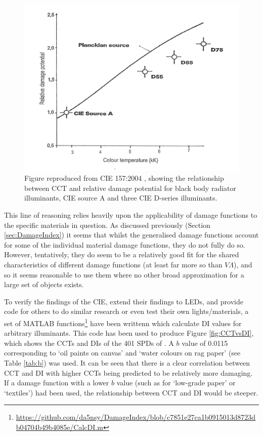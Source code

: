 \begin{figure}[hbtp]
\includegraphics[max width=\textwidth]{figs/LitRev/CIE2004.png} 
\caption{Figure reproduced from CIE 157:2004 \citep[p.16]{cie_cie_2004}, showing the relationship between \gls{CCT} and relative damage potential for black body radiator illuminants, \gls{CIE} source A and three \gls{CIE} D-series illuminants.}
\label{fig:CIE2004}
\end{figure}

This line of reasoning relies heavily upon the applicability of damage functions to the specific materials in question. As discussed previously (Section \ref{sec:DamageIndex}) it seems that whilst the generalised damage functions account for some of the individual material damage functions, they do not fully do so. However, tentatively, they do seem to be a relatively good fit for the shared characteristics of different damage functions (at least far more so than $V\Lambda$), and so it seems reasonable to use them where no other broad approximation for a large set of objects exists.

To verify the findings of the \gls{CIE}, extend their findings to \glspl{LED}, and provide code for others to do similar research or even test their own lights/materials, a set of MATLAB functions\footnote{\url{https://github.com/da5nsy/DamageIndex/blob/c7851e27ca1b0915013d8723db04704b49b4085e/CalcDI.m}} have been writtenn which calculate \gls{DI} values for arbitrary illuminants. This code has been used to produce Figure \ref{fig:CCTvsDI}, which shows the \glspl{CCT} and \glspl{DI} of the 401 \glspl{SPD} of \citet{houser_review_2013}. A $b$ value of 0.0115 corresponding to `oil paints on canvas' and `water colours on rag paper' (see Table \ref{tab:b}) was used. It can be seen that there is a clear correlation between \gls{CCT} and \gls{DI} with higher \glspl{CCT} being predicted to be relatively more damaging. If a damage function with a lower $b$ value (such as for `low-grade paper' or `textiles') had been used, the relationship between \gls{CCT} and \gls{DI} would be steeper.


